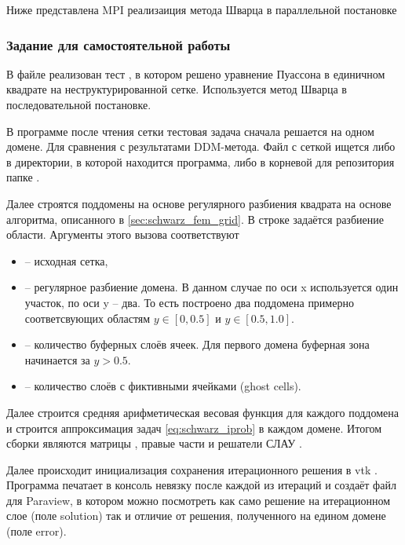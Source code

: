 Ниже представлена MPI реализаиция метода Шварца в параллельной постановке


\subsubsection{Задание для самостоятельной работы}
В файле 
реализован тест ,
в котором решено уравнение Пуассона в единичном квадрате на неструктурированной сетке.
Используется метод Шварца в последовательной постановке.

В программе после чтения сетки тестовая задача сначала решается на одном домене. Для
сравнения с результатами DDM-метода.
Файл с сеткой ищется либо в директории, в которой находится программа, либо в корневой для репозитория папке .

Далее строятся поддомены на основе регулярного разбиения квадрата на основе алгоритма, описанного в \ref{sec:schwarz_fem_grid}.
В строке
задаётся разбиение области.
Аргументы этого вызова соответствуют
\begin{itemize}
\item {} -- исходная сетка,
\item {} -- регулярное разбиение домена. В данном случае по оси x используется один участок, по оси y -- два.
То есть построено два поддомена примерно соответсвующих областям $y\in[0, 0.5]$  и $y\in[0.5, 1.0]$.
\item {} -- количество буферных слоёв ячеек. Для первого домена буферная зона начинается за $y>0.5$.
\item {} -- количество слоёв с фиктивными ячейками (ghost cells).
\end{itemize}

Далее строится средняя арифметическая весовая функция для каждого поддомена  
и строится аппроксимация задач \cref{eq:schwarz_iprob} в каждом домене.
Итогом сборки являются матрицы , правые части 
и решатели СЛАУ .

Далее происходит инициализация сохранения итерационного решения в vtk .
Программа печатает в консоль невязку после каждой из итераций и создаёт файл 
для Paraview, в котором можно посмотреть как само решение на итерационном слое (поле solution) так и отличие от решения, полученного на едином домене (поле error).

